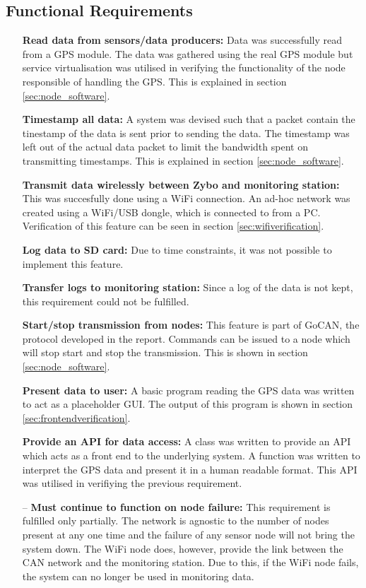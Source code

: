 \subsection{Functional Requirements}
\begin{itemize}
	\item[\cmark] \textbf{Read data from sensors/data producers:}
	Data was successfully read from a GPS module.
	The data was gathered using the real GPS module but service virtualisation was utilised in verifying the functionality of the node responsible of handling the GPS.
	This is explained in section \ref{sec:node_software}.
	\item[\cmark] \textbf{Timestamp all data:}
	A system was devised such that a packet contain the tinestamp of the data is sent prior to sending the data.
	The timestamp was left out of the actual data packet to limit the bandwidth spent on transmitting timestamps.
	This is explained in section \ref{sec:node_software}.
	\item[\cmark] \textbf{Transmit data wirelessly between Zybo and monitoring station:}
	This was succesfully done using a WiFi connection.
	An ad-hoc network was created using a WiFi/USB dongle, which is connected to from a PC.
	Verification of this feature can be seen in section \ref{sec:wifiverification}.
	\item[\xmark] \textbf{Log data to SD card:}
	Due to time constraints, it was not possible to implement this feature.
	\item[\xmark] \textbf{Transfer logs to monitoring station:}
	Since a log of the data is not kept, this requirement could not be fulfilled.
	\item[\cmark] \textbf{Start/stop transmission from nodes:}
	This feature is part of GoCAN, the protocol developed in the report.
	Commands can be issued to a node which will stop start and stop the transmission.
	This is shown in section \ref{sec:node_software}.
	\item[\cmark] \textbf{Present data to user:}
	A basic program reading the GPS data was written to act as a placeholder GUI.
	The output of this program is shown in section \ref{sec:frontendverification}.
	\item[\cmark] \textbf{Provide an API for data access:}
	A class was written to provide an API which acts as a front end to the underlying system.
	A function was written to interpret the GPS data and present it in a human readable format.
	This API was utilised in verifiying the previous requirement.
	\item[--] \textbf{Must continue to function on node failure:}
	This requirement is fulfilled only partially. 
	The network is agnostic to the number of nodes present at any one time and the failure of any sensor node will not bring the system down.
	The WiFi node does, however, provide the link between the CAN network and the monitoring station.
	Due to this, if the WiFi node fails, the system can no longer be used in monitoring data.
\end{itemize}

